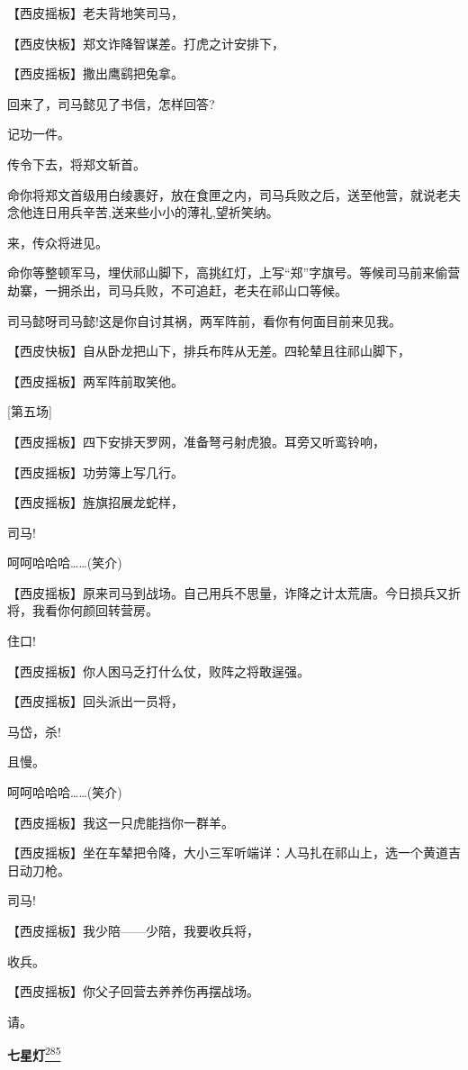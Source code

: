 【西皮摇板】老夫背地笑司马，

【西皮快板】郑文诈降智谋差。打虎之计安排下，

【西皮摇板】撒出鹰鹞把兔拿。

回来了，司马懿见了书信，怎样回答?

记功一件。

传令下去，将郑文斩首。

命你将郑文首级用白绫裹好，放在食匣之内，司马兵败之后，送至他营，就说老夫念他连日用兵辛苦,送来些小小的薄礼,望祈笑纳。

来，传众将进见。

命你等整顿军马，埋伏祁山脚下，高挑红灯，上写``郑''字旗号。等候司马前来偷营劫寨，一拥杀出，司马兵败，不可追赶，老夫在祁山口等候。

司马懿呀司马懿!这是你自讨其祸，两军阵前，看你有何面目前来见我。

【西皮快板】自从卧龙把山下，排兵布阵从无差。四轮辇且往祁山脚下，

【西皮摇板】两军阵前取笑他。

{[}第五场{]}

【西皮摇板】四下安排天罗网，准备弩弓射虎狼。耳旁又听鸾铃响，

【西皮摇板】功劳簿上写几行。

【西皮摇板】旌旗招展龙蛇样，

司马!

呵呵哈哈哈\ldots{}\ldots{}(笑介)

【西皮摇板】原来司马到战场。自己用兵不思量，诈降之计太荒唐。今日损兵又折将，我看你何颜回转营房。

住口!

【西皮摇板】你人困马乏打什么仗，败阵之将敢逞强。

【西皮摇板】回头派出一员将，

马岱，杀!

且慢。

呵呵哈哈哈\ldots{}\ldots{}(笑介)

【西皮摇板】我这一只虎能挡你一群羊。

【西皮摇板】坐在车辇把令降，大小三军听端详：人马扎在祁山上，选一个黄道吉日动刀枪。

司马!

【西皮摇板】我少陪------少陪，我要收兵将，

收兵。

【西皮摇板】你父子回营去养养伤再摆战场。

请。

\textbf{七星灯}\protect\hyperlink{fn285}{\textsuperscript{285}}

